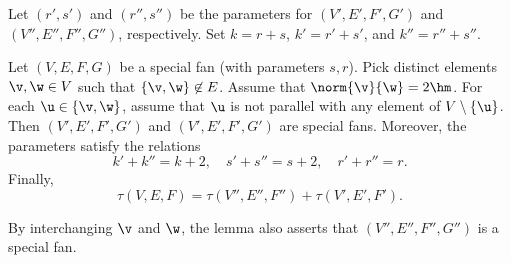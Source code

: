 Let $(r',s')$ and $(r'',s'')$ be the parameters for $(V',E',F',G')$
and $(V'',E'',F'',G'')$, respectively.  Set $k=r+s$, $k'=r'+s'$, and
$k''=r''+s''$.

\begin{lemma}\label{lemma:param-add}  
Let $(V,E,F,G)$ be a special fan (with parameters $s,r$).  Pick
distinct elements $\v,\w\in V$ such that $\{\v,\w\}\not\in E$.
Assume that $\norm{\v}{\w}=2\hm$.  For each $\u\in \{\v,\w\}$,
assume that $\u$ is not parallel with any element of 
$V\setminus\{\u\}$.
Then $(V',E',F',G')$ and $(V',E',F',G')$ are special fans.  Moreover,
the parameters satisfy the relations
\begin{displaymath}
k'+k'' = k + 2,\quad s'+s'' = s + 2,\quad r'+r''=r.
\end{displaymath}
Finally,
\begin{displaymath}
\tau(V,E,F)= \tau(V'',E'',F'') +\tau(V',E',F').
\end{displaymath}
\end{lemma}

By interchanging $\v$ and $\w$, the lemma also asserts that
$(V'',E'',F'',G'')$ is a special fan.

